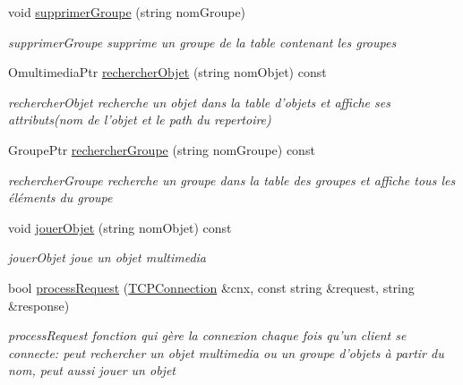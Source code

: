 \begin{DoxyCompactItemize}
void \hyperlink{class_fabriquer_a6b079553cd4d8ca1b8ac4a209630eff8}{supprimer\+Groupe} (string nom\+Groupe)
\begin{DoxyCompactList}\small\item\em supprimer\+Groupe supprime un groupe de la table contenant les groupes \end{DoxyCompactList}\item 
Omultimedia\+Ptr \hyperlink{class_fabriquer_a1ddcb6f722edfbc0695933bcc4aba54c}{rechercher\+Objet} (string nom\+Objet) const 
\begin{DoxyCompactList}\small\item\em rechercher\+Objet recherche un objet dans la table d'objets et affiche ses attributs(nom de l'objet et le path du repertoire) \end{DoxyCompactList}\item 
Groupe\+Ptr \hyperlink{class_fabriquer_a70a1e7aab8a02d513f9df4a4a3bd4670}{rechercher\+Groupe} (string nom\+Groupe) const 
\begin{DoxyCompactList}\small\item\em rechercher\+Groupe recherche un groupe dans la table des groupes et affiche tous les éléments du groupe \end{DoxyCompactList}\item 
void \hyperlink{class_fabriquer_a7b38cc395f557fe9de2632f8889afa59}{jouer\+Objet} (string nom\+Objet) const 
\begin{DoxyCompactList}\small\item\em jouer\+Objet joue un objet multimedia \end{DoxyCompactList}\item 
bool \hyperlink{class_fabriquer_a397d5ea032597d8e8c87d4f4f996b451}{process\+Request} (\hyperlink{classcppu_1_1_t_c_p_connection}{T\+C\+P\+Connection} \&cnx, const string \&request, string \&response)
\begin{DoxyCompactList}\small\item\em process\+Request fonction qui gère la connexion chaque fois qu'un client se connecte\+: peut rechercher un objet multimedia ou un groupe d'objets à partir du nom, peut aussi jouer un objet \end{DoxyCompactList}\end{DoxyCompactItemize}


